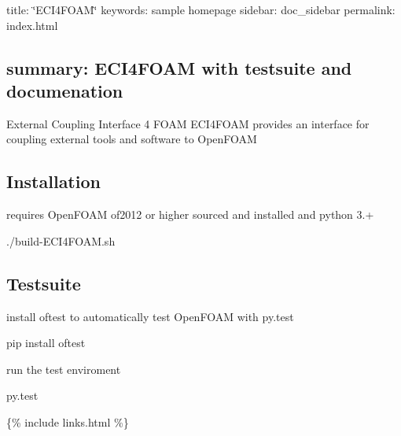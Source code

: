

 title\+: \char`\"{}\+E\+C\+I4\+F\+O\+A\+M\char`\"{} keywords\+: sample homepage sidebar\+: doc\+\_\+sidebar permalink\+: index.\+html \subsection*{summary\+: E\+C\+I4\+F\+O\+AM with testsuite and documenation }

External Coupling Interface 4 F\+O\+AM E\+C\+I4\+F\+O\+AM provides an interface for coupling external tools and software to Open\+F\+O\+AM

\subsection*{Installation}

requires Open\+F\+O\+AM of2012 or higher sourced and installed and python 3.+


\begin{DoxyCode}
./build-ECI4FOAM.sh
\end{DoxyCode}
 \subsection*{Testsuite}

install oftest to automatically test Open\+F\+O\+AM with py.\+test


\begin{DoxyCode}
pip install oftest
\end{DoxyCode}


run the test enviroment 
\begin{DoxyCode}
py.test
\end{DoxyCode}


\{\% include links.\+html \%\} 